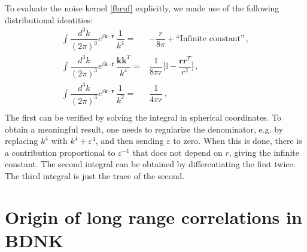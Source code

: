 \documentclass[a4paper, amsfonts, amssymb, amsmath, reprint, showkeys, nofootinbib, twoside,notitlepage,onecolumn]{revtex4-2}
\theoremstyle{definition}
\begin{document}
To evaluate the noise kernel \eqref{fbruf} explicitly, we made use of the following distributional identities:
\begin{equation}
\begin{split}
 \int \dfrac{d^3 k}{(2\pi)^3} e^{i\textbf{k}\cdot \textbf{r}} \, \dfrac{1}{k^4} ={}&  -\dfrac{r}{8\pi} + \text{``Infinite constant''} \, , \\  
\int \dfrac{d^3 k}{(2\pi)^3} e^{i\textbf{k}\cdot \textbf{r}} \, \dfrac{\textbf{k}\textbf{k}^T}{k^4} ={}& \dfrac{1}{8\pi r} \bigg[ \mathbb{I}-\dfrac{\textbf{r}\textbf{r}^T}{r^2} \bigg] \, , \\  
\int \dfrac{d^3 k}{(2\pi)^3} e^{i\textbf{k}\cdot \textbf{r}} \, \dfrac{1}{k^2} ={}& \dfrac{1}{4\pi r} \, , \\
\end{split}
\end{equation}
The first can be verified by solving the integral in spherical coordinates. To obtain a meaningful result, one needs to regularize the denominator, e.g. by replacing $k^4$ with $k^4{+}\varepsilon^4$, and then sending $\varepsilon$ to zero. When this is done, there is a contribution proportional to $\varepsilon^{-1}$ that does not depend on $r$, giving the infinite constant. The second integral can be obtained by differentiating the first twice. The third integral is just the trace of the second.

\section{Origin of long range correlations in BDNK}\label{reparam}
\end{document}
